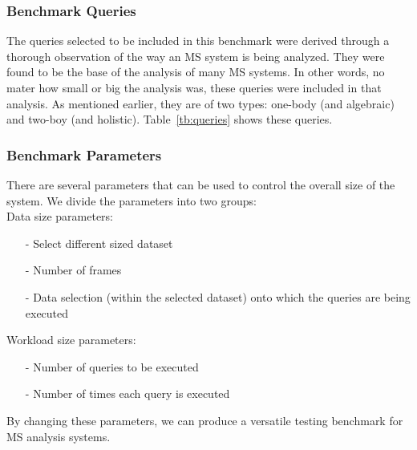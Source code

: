 \documentclass[10pt,journal,final,letterpaper,twocolumn]{IEEEtran}
\begin{document}

\subsubsection{Benchmark Queries}
The queries selected to be included in this benchmark were derived
through a thorough observation of the way an MS system is being
analyzed. They were found to be the base of the analysis of many MS
systems. In other words, no mater how small or big the analysis was,
these queries were included in that analysis. As mentioned earlier,
they are of two types: one-body (and algebraic) and two-boy (and
holistic). Table~\ref{tb:queries} shows these queries.


\subsubsection{Benchmark Parameters} There are several parameters
that can be used to control the overall size of the system. We divide the parameters into two groups:\\
Data size parameters:
\begin{itemize}
\item[-]Select different sized dataset
\item[-]Number of frames
\item[-]Data selection (within the selected dataset) onto which the queries are being executed
\end{itemize}
Workload size parameters:
\begin{itemize}
\item[-]Number of queries to be executed
\item[-]Number of times each query is executed
\end{itemize}
By changing these parameters, we can produce a versatile testing
benchmark for MS analysis systems.
\end{document}
